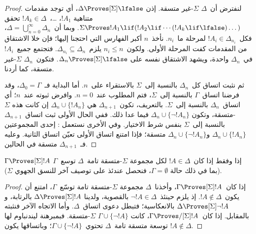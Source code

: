 \documentclass[../../../include/open-logic-section]{subfiles}
\begin{document}
\begin{proof}
لنفترض أن~$\Delta$ $\Sigma$-غير متسقة.
إذن $\Delta \Proves[\Sigma] \lfalse$، أي توجد مقدمات متناهية
$!A_1$، \dots،~$!A_k \in \Delta$ تحقق
$\Sigma \Proves !A_1 \lif (!A_2 \lif \cdots (!A_k \lif
\lfalse)\dots)$. وبما أن~$\Delta = \bigcup_{n=0}^\infty \Delta_n$،
فكل~$!A_i \in \Delta_{n_i}$ لمرحلة ما~$n_i$.
نأخذ~$n$ أكبر الفهارس التي احتجنا إليها؛ فإن خلا الاشتقاق من المقدمات
كفت المرحلة الأولى. ولكون~$n_i \le n$ يلزم~$\Delta_{n_i} \subseteq \Delta_n$.
فتجتمع جميع~$!A_i$ في~$\Delta_n$ واحدة،
ويشهد الاشتقاق نفسه على $\Delta_n \Proves[\Sigma] \lfalse$.
فتكون~$\Delta_n$ $\Sigma$-غير متسقة، كما أردنا.

ثم نثبت اتساق كل~$\Delta_n$ بالنسبة إلى~$\Sigma$ بالاستقراء على~$n$.
أما البداية فـ~$\Delta_0 = \Gamma$، وقد فرضنا اتساق~$\Gamma$
بالنسبة إلى~$\Sigma$، فتم المطلوب عند~$n = 0$.
وافرض ثبوته عند~$n$؛ أي اتساق~$\Delta_n$ بالنسبة إلى~$\Sigma$.
بالتعريف، تكون~$\Delta_{n+1}$ هي
$\Delta_n \cup \{!A_n\}$ إن كانت هذه $\Sigma$-متسقة،
وتكون $\Delta_n \cup \{\lnot!A_n\}$ فيما عدا ذلك.
ففي الحال الأولى ثبت اتساق~$\Delta_{n+1}$ بالنسبة إلى~$\Sigma$
بنفس شرط الاختيار. وفي الأخرى نستعمل
:
إحدى المجموعتين $\Delta_n \cup \{!A_n\}$ و$\Delta_n \cup \{\lnot!A_n\}$
متسقة؛ فإذا امتنع اتساق الأولى تعيّن اتساق الثانية.
وعليه فـ~$\Delta_{n+1}$ متسقة في الحالين.
\end{proof}

\begin{cor}
  $\Gamma \Proves[\Sigma] !A$ إذا وفقط إذا كان~$!A \in \Delta$ لكل
  مجموعة $\Sigma$-متسقة تامة~$\Delta$ توسع~$\Gamma$ (بما في ذلك حالة
  $\Gamma = \emptyset$، فنحصل عندئذ على توصيف آخر للنسق الجهوي
  $\Sigma$).
\end{cor}

\begin{proof}
  إذا كان~$\Gamma \Proves[\Sigma] !A$، وأخذنا~$\Delta$ مجموعة
  $\Sigma$-متسقة تامة توسّع~$\Gamma$، امتنع أن يكون~$!A \notin \Delta$.
  إذ يلزم حينئذ~$\lnot!A \in \Delta$ بالقصوية، ولدينا
  $\Delta \Proves[\Sigma] !A$ بالرتابة، و
  $\Delta \Proves[\Sigma] \lnot!A$ بالانعكاسية؛ فتبطل دعوى اتساق~$\Delta$.
  وأما الاتجاه الآخر فنثبته بالمقابل. إذا كان~$\Gamma \Proves/[\Sigma] !A$،
  كانت $\Gamma \cup \{\lnot!A\}$ $\Sigma$-متسقة.
  فبمبرهنة ليندنباوم لها توسعة متسقة تامة~$\Delta$
  تحتوي~$\Gamma \cup \{\lnot!A\}$؛ وباتساقها يكون $!A \notin \Delta$.
\end{proof}
\end{document}
